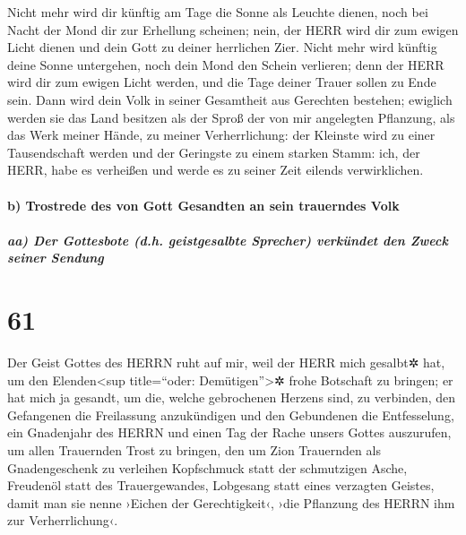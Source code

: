 Nicht mehr wird dir künftig am Tage die Sonne als Leuchte
dienen, noch bei Nacht der Mond dir zur Erhellung scheinen; nein, der
HERR wird dir zum ewigen Licht dienen und dein Gott zu deiner herrlichen
Zier. Nicht mehr wird künftig deine Sonne untergehen,
noch dein Mond den Schein verlieren; denn der HERR wird dir zum ewigen
Licht werden, und die Tage deiner Trauer sollen zu Ende sein.
Dann wird dein Volk in seiner Gesamtheit aus Gerechten
bestehen; ewiglich werden sie das Land besitzen als der Sproß der von
mir angelegten Pflanzung, als das Werk meiner Hände, zu meiner
Verherrlichung: der Kleinste wird zu einer Tausendschaft
werden und der Geringste zu einem starken Stamm: ich, der HERR, habe es
verheißen und werde es zu seiner Zeit eilends verwirklichen.

\hypertarget{b-trostrede-des-von-gott-gesandten-an-sein-trauerndes-volk}{%
\paragraph{b) Trostrede des von Gott Gesandten an sein trauerndes
Volk}\label{b-trostrede-des-von-gott-gesandten-an-sein-trauerndes-volk}}

\hypertarget{aa-der-gottesbote-d.h.-geistgesalbte-sprecher-verkuxfcndet-den-zweck-seiner-sendung}{%
\subparagraph{aa) Der Gottesbote (d.h. geistgesalbte Sprecher) verkündet
den Zweck seiner
Sendung}\label{aa-der-gottesbote-d.h.-geistgesalbte-sprecher-verkuxfcndet-den-zweck-seiner-sendung}}

\hypertarget{section-60}{%
\section{61}\label{section-60}}

Der Geist Gottes des HERRN ruht auf mir, weil der HERR
mich gesalbt✲ hat, um den Elenden\textless sup title=``oder:
Demütigen''\textgreater✲ frohe Botschaft zu bringen; er hat mich ja
gesandt, um die, welche gebrochenen Herzens sind, zu verbinden, den
Gefangenen die Freilassung anzukündigen und den Gebundenen die
Entfesselung, ein Gnadenjahr des HERRN und einen Tag der
Rache unsers Gottes auszurufen, um allen Trauernden Trost zu bringen,
den um Zion Trauernden als Gnadengeschenk zu verleihen
Kopfschmuck statt der schmutzigen Asche, Freudenöl statt des
Trauergewandes, Lobgesang statt eines verzagten Geistes, damit man sie
nenne ›Eichen der Gerechtigkeit‹, ›die Pflanzung des HERRN ihm zur
Verherrlichung‹.

